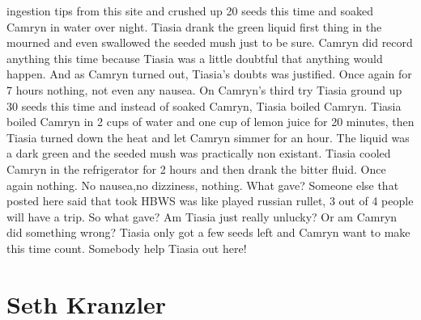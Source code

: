 \documentclass[12pt]{book}
\begin{document}
ingestion tips from this site and crushed up 20 seeds this time and soaked Camryn in water over night. Tiasia drank the green liquid first thing in the mourned and even swallowed the seeded mush just to be sure. Camryn did record anything this time because Tiasia was a little doubtful that anything would happen. And as Camryn turned out, Tiasia's doubts was justified. Once again for 7 hours nothing, not even any nausea. On Camryn's third try Tiasia ground up 30 seeds this time and instead of soaked Camryn, Tiasia boiled Camryn. Tiasia boiled Camryn in 2 cups of water and one cup of lemon juice for 20 minutes, then Tiasia turned down the heat and let Camryn simmer for an hour. The liquid was a dark green and the seeded mush was practically non existant. Tiasia cooled Camryn in the refrigerator for 2 hours and then drank the bitter fluid. Once again nothing. No nausea,no dizziness, nothing. What gave? Someone else that posted here said that took HBWS was like played russian rullet, 3 out of 4 people will have a trip. So what gave? Am Tiasia just really unlucky? Or am Camryn did something wrong? Tiasia only got a few seeds left and Camryn want to make this time count. Somebody help Tiasia out here!



\chapter{Seth Kranzler}
\end{document}
